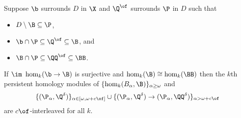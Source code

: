 \begin{lemma}
  Suppose $\b$ surrounds $D$ in $\X$ and $\Q^\of$ surrounds $\P$ in $D$ such that
  \begin{itemize}
    \item $D\setminus \B\subseteq \P$,
    \item $\b\cap \P \subseteq \Q^\of\subseteq \B$, and
    \item $\B\cap \P\subseteq \QQ^\of\subseteq \BB$.
  \end{itemize}

  If $\im~\hom_k(\b\to\B)$ is surjective and $\hom_k(\B)\cong \hom_k(\BB)$ then the $k$th persistent homology modules of $\{\hom_k(B_\alpha, \B)\}_{\alpha\geq\omega}$ and
  \[\{(\P_\alpha, \Q^\delta)\}_{\alpha\in[\omega,\omega+c\of]}\cup\{(\P_\alpha, \Q^\delta)\to (\P_\alpha,\QQ^\delta)\}_{\alpha > \omega+c\of}\]
  are $c\of$-interleaved for all $k$.
\end{lemma}
